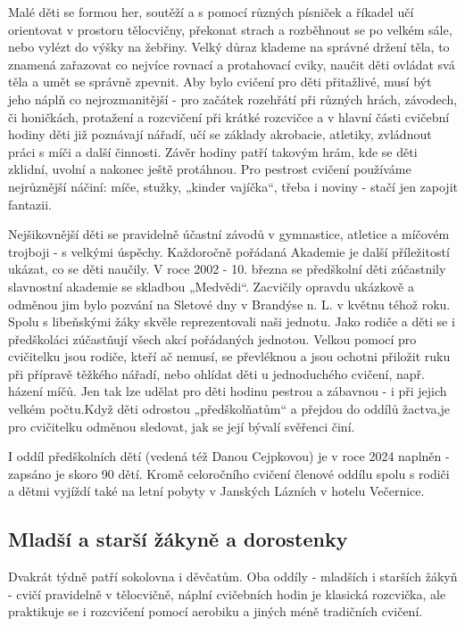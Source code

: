 Malé děti se formou her, soutěží a s pomocí různých písniček a říkadel
učí orientovat v prostoru tělocvičny, překonat strach a rozběhnout se po
velkém sále, nebo vylézt do výšky na žebřiny. Velký důraz klademe na
správné držení těla, to znamená zařazovat co nejvíce rovnací a
protahovací cviky, naučit děti ovládat svá těla a umět se správně
zpevnit. Aby bylo cvičení pro děti přitažlivé, musí být jeho náplň co
nejrozmanitější - pro začátek rozehřátí při různých hrách, závodech, či
honičkách, protažení a rozcvičení při krátké rozcvičce a v hlavní části
cvičební hodiny děti již poznávají nářadí, učí se základy akrobacie,
atletiky, zvládnout práci s míči a další činnosti. Závěr hodiny patří
takovým hrám, kde se děti zklidní, uvolní a nakonec ještě protáhnou. Pro
pestrost cvičení používáme nejrůznější náčiní: míče, stužky, „kinder
vajíčka``, třeba i noviny - stačí jen zapojit fantazii.

Nejšikovnější děti se pravidelně účastní závodů v gymnastice, atletice a
míčovém trojboji - s velkými úspěchy. Každoročně pořádaná Akademie je
další příležitostí ukázat, co se děti naučily. V roce 2002 - 10. března
se předškolní děti zúčastnily slavnostní akademie se skladbou
„Medvědi``. Zacvičily opravdu ukázkově a odměnou jim bylo pozvání na
Sletové dny v Brandýse n. L. v květnu téhož roku. Spolu s libeňskými
žáky skvěle reprezentovali naši jednotu. Jako rodiče a děti se i
předškoláci zúčastňují všech akcí pořádaných jednotou. Velkou pomocí pro
cvičitelku jsou rodiče, kteří ač nemusí, se převléknou a jsou ochotni
přiložit ruku při přípravě těžkého nářadí, nebo ohlídat děti u
jednoduchého cvičení, např. házení míčů. Jen tak lze udělat pro děti
hodinu pestrou a zábavnou - i při jejich velkém počtu.Když děti odrostou
„předškolňatům`` a přejdou do oddílů žactva,je pro cvičitelku odměnou
sledovat, jak se její bývalí svěřenci činí.

I oddíl předškolních dětí (vedená též Danou Cejpkovou) je v roce 2024
naplněn - zapsáno je skoro 90 dětí. Kromě celoročního cvičení členové
oddílu spolu s rodiči a dětmi vyjíždí také na letní pobyty v Janských
Lázních v hotelu Večernice.

\subsection{Mladší a starší žákyně a
dorostenky}\label{mladux161uxed-a-starux161uxed-ux17euxe1kynux11b-a-dorostenky}

Dvakrát týdně patří sokolovna i děvčatům. Oba oddíly - mladších i
starších žákyň - cvičí pravidelně v tělocvičně, náplní cvičebních hodin
je klasická rozcvička, ale praktikuje se i rozcvičení pomocí aerobiku a
jiných méně tradičních cvičení.

